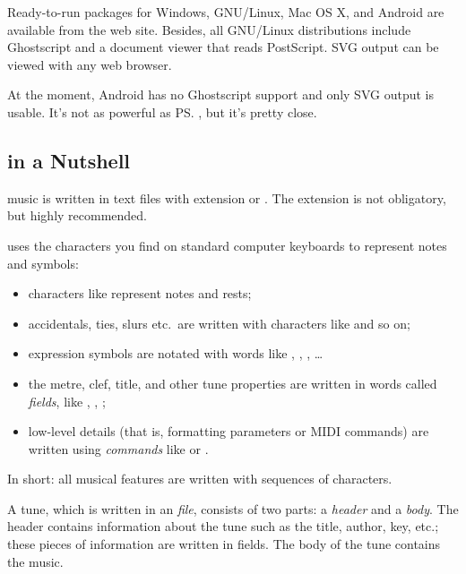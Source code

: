 \documentclass[a4paper,12pt]{book}
\begin{document}
Ready-to-run packages for Windows, GNU/Linux, Mac OS X, and Android
are available from the \ABCPLUS{} web site. Besides, all GNU/Linux
distributions include Ghostscript and a document viewer that reads
PostScript. SVG output can be viewed with any web browser.

At the moment, Android has no Ghostscript support and only SVG output
is usable. It's not as powerful as \ps, but it's pretty close.


\subsection{\ABC{} in a Nutshell}
\label{sec:nutshell}

\ABC{} music is written in text files with extension  or
. The extension is not obligatory, but highly recommended.

\ABC{} uses the characters you find on standard computer keyboards to
represent notes and symbols:

\begin{itemize}
  
  \item characters like  represent notes and rests;
  
  \item accidentals, ties, slurs etc.\ are written with characters like
  \car{= \_ - ( )} and so on;
  
  \item expression symbols are notated with words like ,
  , , {\ldots}
  
  \item the metre, clef, title, and other tune properties are written
  in words called \emph{fields}, like , ,
  ;
  
  \item low-level details (that is, formatting parameters or MIDI
  commands) are written using \emph{commands} like 
  or .
  
\end{itemize}

In short: all musical features are written with sequences of
characters.

A tune, which is written in an \emph{\ABC{} file}, consists of two
parts: a \emph{header} and a \emph{body}. The header contains
information about the tune such as the title, author, key, etc.; these
pieces of information are written in fields. The body of the tune
contains the music.
\end{document}
